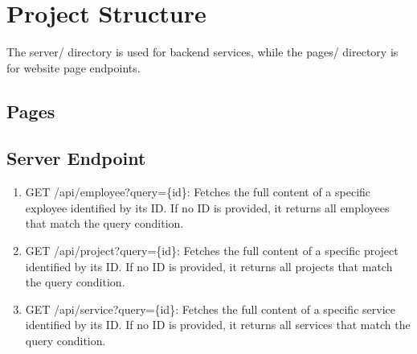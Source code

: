 
\section{Project Structure}
The server/ directory is used for backend services, while the pages/ directory is for website page endpoints.
\subsection{Pages}
\subsection{Server Endpoint}
\begin{enumerate}
	\item GET /api/employee?query=\{id\}: Fetches the full content of a specific exployee identified by its ID. If no ID is provided, it returns all employees that match the query condition.
	\item GET /api/project?query=\{id\}: Fetches the full content of a specific project identified by its ID. If no ID is provided, it returns all projects that match the query condition.
	\item GET /api/service?query=\{id\}: Fetches the full content of a specific service identified by its ID. If no ID is provided, it returns all services that match the query condition.
\end{enumerate}